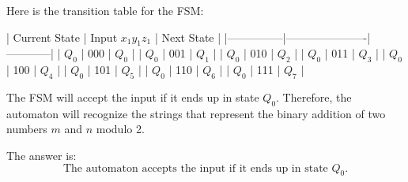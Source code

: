 Here is the transition table for the FSM:

| Current State | Input \(x_1y_1z_1\) | Next State |
|---------------|----------------------|------------|
| \(Q_0\)       | 000                  | \(Q_0\)    |
| \(Q_0\)       | 001                  | \(Q_1\)    |
| \(Q_0\)       | 010                  | \(Q_2\)    |
| \(Q_0\)       | 011                  | \(Q_3\)    |
| \(Q_0\)       | 100                  | \(Q_4\)    |
| \(Q_0\)       | 101                  | \(Q_5\)    |
| \(Q_0\)       | 110                  | \(Q_6\)    |
| \(Q_0\)       | 111                  | \(Q_7\)    |

The FSM will accept the input if it ends up in state \(Q_0\). Therefore, the automaton will recognize the strings that represent the binary addition of two numbers \(m\) and \(n\) modulo 2.

The answer is:
\[
\boxed{\text{The automaton accepts the input if it ends up in state } Q_0.}
\]